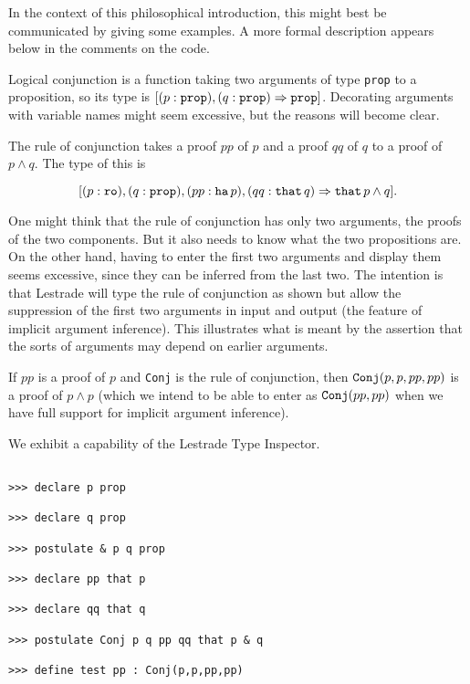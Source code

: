 \documentclass[12pt]{article}
\begin{document}
In the context of this philosophical introduction, this might best be communicated by giving some examples.  A more formal description appears below in the comments on the code.

Logical conjunction is a function taking two arguments of type {\tt prop} to a proposition, so its type is $[(p:{\tt prop}),(q:{\tt prop}) \Rightarrow {\tt prop}]$.  Decorating arguments with variable names might seem excessive, but the reasons will become clear.

The rule of conjunction takes a proof $pp$ of $p$ and a proof $qq$ of $q$ to a proof of $p \wedge q$.    The type of this is 

$$[(p:\verb prop ),(q:{\tt prop}),(pp: \verb that   \, p),(qq:{\tt that}\, q) \Rightarrow {\tt that}\, p \wedge q].$$

One might think that the rule of conjunction has only two arguments, the proofs of the two components.  But it also needs to know what the two propositions are.  On the other hand, having to enter the first two arguments and display them seems excessive, since they can be inferred from the last two.  The intention is that Lestrade will type the rule of conjunction as shown but allow the suppression of the first two arguments in input and output (the feature of implicit argument inference).  This illustrates what is meant by the assertion that the
sorts of arguments may depend on earlier arguments.

If $pp$ is a proof of $p$ and {\tt Conj} is the rule of conjunction, then ${\tt Conj}(p,p,pp,pp)$ is a proof of $p \wedge p$ (which we intend to be able to enter as ${\tt Conj}(pp,pp)$ when we have full support for implicit argument inference).

We exhibit a capability of the Lestrade Type Inspector.

\begin{verbatim}

>>> declare p prop

>>> declare q prop

>>> postulate & p q prop

>>> declare pp that p

>>> declare qq that q

>>> postulate Conj p q pp qq that p & q

>>> define test pp : Conj(p,p,pp,pp)

\end{verbatim}
\end{document}
